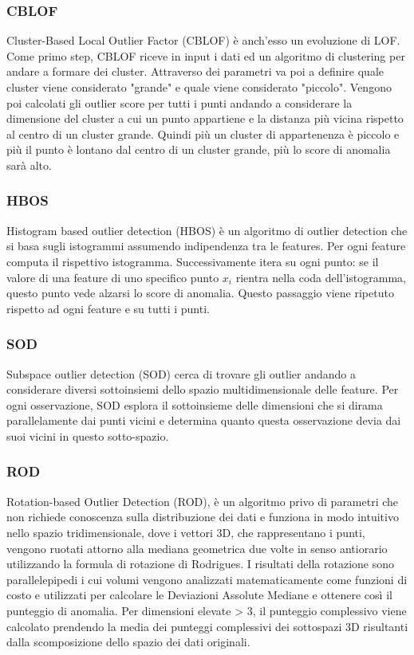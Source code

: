\subsubsection{CBLOF}
Cluster-Based Local Outlier Factor (CBLOF) è anch'esso un evoluzione di LOF.
Come primo step, CBLOF riceve in input i dati ed un algoritmo di clustering per andare a formare dei cluster. Attraverso dei parametri va poi a definire quale cluster viene considerato "grande" e quale viene considerato "piccolo". Vengono poi calcolati gli outlier score per tutti i punti andando a considerare la dimensione del cluster a cui un punto appartiene e la distanza più vicina rispetto al centro di un cluster grande. Quindi più un cluster di appartenenza è piccolo e più il punto è lontano dal centro di un cluster grande, più lo score di anomalia sarà alto. 

\subsubsection{HBOS}
Histogram based outlier detection (HBOS) è un algoritmo di outlier detection che si basa sugli istogrammi assumendo indipendenza tra le features. Per ogni feature computa il rispettivo istogramma. Successivamente itera su ogni punto: se il valore di una feature di uno specifico punto $x_i$ rientra nella coda dell'istogramma, questo punto vede alzarsi lo score di anomalia. Questo passaggio viene ripetuto rispetto ad ogni feature e su tutti i punti.

\subsubsection{SOD}
Subspace outlier detection (SOD) cerca di trovare gli outlier andando a considerare diversi sottoinsiemi dello spazio multidimensionale delle feature. Per ogni osservazione, SOD esplora il sottoinsieme delle dimensioni che si dirama parallelamente dai punti vicini e determina quanto questa osservazione devia dai suoi vicini in questo sotto-spazio. 

\subsubsection{ROD}
Rotation-based Outlier Detection (ROD),  è un algoritmo privo di parametri che non richiede conoscenza sulla distribuzione dei dati e funziona in modo intuitivo nello spazio tridimensionale, dove i vettori 3D, che rappresentano i punti, vengono ruotati attorno alla mediana geometrica due volte in senso antiorario utilizzando la formula di rotazione di Rodrigues. I risultati della rotazione sono parallelepipedi i cui volumi vengono analizzati matematicamente come funzioni di costo e utilizzati per calcolare le Deviazioni Assolute Mediane e ottenere così il punteggio di anomalia. Per dimensioni elevate > 3, il punteggio complessivo viene calcolato prendendo la media dei punteggi complessivi dei sottospazi 3D risultanti dalla scomposizione dello spazio dei dati originali.


